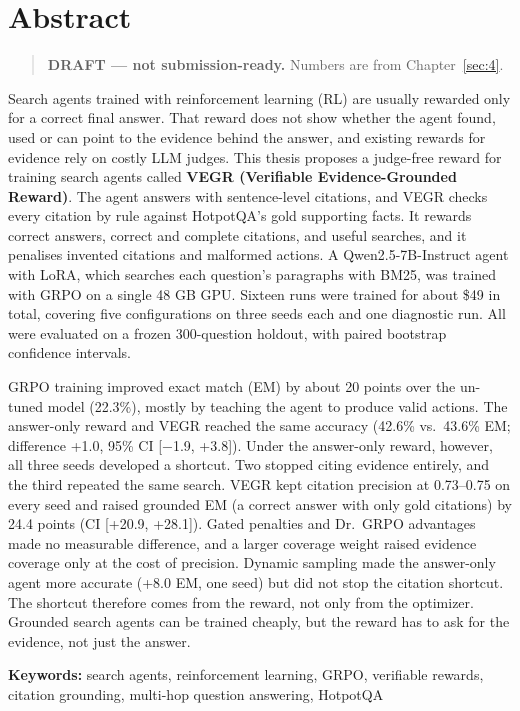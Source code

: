 \chapter*{Abstract}\label{abstract}

\begin{quote}
\textbf{DRAFT --- not submission-ready.} Numbers are from
Chapter~\ref{sec:4}.
\end{quote}

Search agents trained with reinforcement learning (RL) are usually
rewarded only for a correct final answer. That reward does not show
whether the agent found, used or can point to the evidence behind the
answer, and existing rewards for evidence rely on costly LLM judges.
This thesis proposes a judge-free reward for training search agents
called \textbf{VEGR (Verifiable Evidence-Grounded Reward)}. The agent
answers with sentence-level citations, and VEGR checks every citation by
rule against HotpotQA's gold supporting facts. It rewards correct
answers, correct and complete citations, and useful searches, and it
penalises invented citations and malformed actions. A
Qwen2.5-7B-Instruct agent with LoRA, which searches each question's
paragraphs with BM25, was trained with GRPO on a single 48 GB GPU.
Sixteen runs were trained for about \$49 in total, covering five
configurations on three seeds each and one diagnostic run. All were
evaluated on a frozen 300-question holdout, with paired bootstrap
confidence intervals.

GRPO training improved exact match (EM) by about 20 points over the
un-tuned model (22.3\%), mostly by teaching the agent to produce valid
actions. The answer-only reward and VEGR reached the same accuracy
(42.6\% vs.~43.6\% EM; difference +1.0, 95\% CI {[}−1.9, +3.8{]}). Under
the answer-only reward, however, all three seeds developed a shortcut.
Two stopped citing evidence entirely, and the third repeated the same
search. VEGR kept citation precision at 0.73--0.75 on every seed and
raised grounded EM (a correct answer with only gold citations) by 24.4
points (CI {[}+20.9, +28.1{]}). Gated penalties and Dr.~GRPO advantages
made no measurable difference, and a larger coverage weight raised
evidence coverage only at the cost of precision. Dynamic sampling made
the answer-only agent more accurate (+8.0 EM, one seed) but did not stop
the citation shortcut. The shortcut therefore comes from the reward, not
only from the optimizer. Grounded search agents can be trained cheaply,
but the reward has to ask for the evidence, not just the answer.

\textbf{Keywords:} search agents, reinforcement learning, GRPO,
verifiable rewards, citation grounding, multi-hop question answering,
HotpotQA
